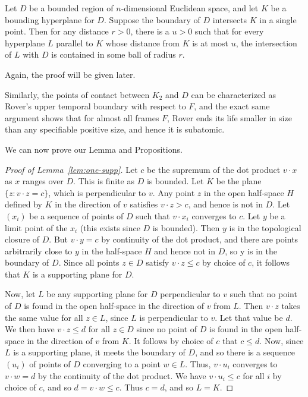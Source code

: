 \begin{prp}\label{prp:distance} Let $D$ be a bounded region of $n$-dimensional Euclidean space, and let $K$ be a bounding hyperplane for $D$. Suppose the boundary of $D$ intersects $K$ in a single point. Then for any distance $r>0$, there is a $u>0$ such that for every hyperplane $L$ parallel to $K$ whose distance from $K$ is at most $u$, the intersection of $L$ with $D$ is contained in some ball of radius $r$.
\end{prp}

Again, the proof will be given later.

Similarly, the points of contact between $K_2$ and $D$ can be characterized as Rover's upper temporal boundary with respect to $F$, and the exact same argument shows that for almost all frames $F$, Rover ends its life smaller in size than any specifiable positive size, and hence it is subatomic.

We can now prove our Lemma and Propositions.

\begin{proof}[Proof of Lemma~\ref{lem:one-supp}]
Let $c$ be the supremum of the dot product $v\cdot x$ as $x$ ranges over $D$. This is finite as $D$ is bounded. Let 
$K$ be the plane $\{ z : v\cdot z = c \}$, which is perpendicular to $v$. Any point $z$ in the open half-space $H$ defined by $K$ in the direction of $v$ satisfies $v\cdot z > c$, and hence is not in $D$. Let $(x_i)$ be a sequence of points of $D$ such that $v\cdot x_i$ converges to $c$. Let $y$ be a limit point of the $x_i$ (this exists since $D$ is bounded). Then $y$ is in the topological closure of $D$. But $v\cdot y = c$ by continuity of the dot product, and there are points arbitrarily close to $y$ in the half-space $H$ and hence not in $D$, so y is in the boundary of $D$. Since all points $z\in D$ satisfy $v\cdot z \le c$ by choice of $c$, it follows that $K$ is a supporting plane for $D$.
 
Now, let $L$ be any supporting plane for $D$ perpendicular to $v$ such that no point of $D$ is found in the open half-space in the direction of $v$ from $L$. Then $v\cdot z$ takes the same value for all $z \in L$, since $L$ is perpendicular to $v$. Let that value be $d$. We then have $v\cdot z \le d$ for all $z\in D$ since no point of $D$ is found in the open half-space in the direction of $v$ from $K$. It follows by choice of $c$ that $c \le d$. Now, since $L$ is a supporting plane, it meets the boundary of $D$, and so there is a sequence $(u_i)$ of points of $D$ converging to a point $w\in L$. Thus, $v\cdot u_i$ converges to $v\cdot w = d$ by  the continuity of the dot product. We have $v\cdot u_i \le c$ for all $i$ by choice of $c$, and so $d = v\cdot w \le c$.
Thus $c = d$, and so $L = K$.
\end{proof}

